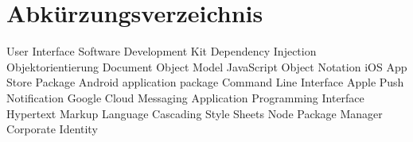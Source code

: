 
\chapter*{Abkürzungsverzeichnis}

\begin{acronym}
  {User Interface}
  {Software Development Kit}
  {Dependency Injection}
   {Objektorientierung}
   {Document Object Model}
   {JavaScript Object Notation}
   {iOS App Store Package}
   {Android application package}
   {Command Line Interface}
   {Apple Push Notification}
   {Google Cloud Messaging}
   {Application Programming Interface}
   {Hypertext Markup Language}
   {Cascading Style Sheets}
   {Node Package Manager}
   {Corporate Identity}
\end{acronym}
